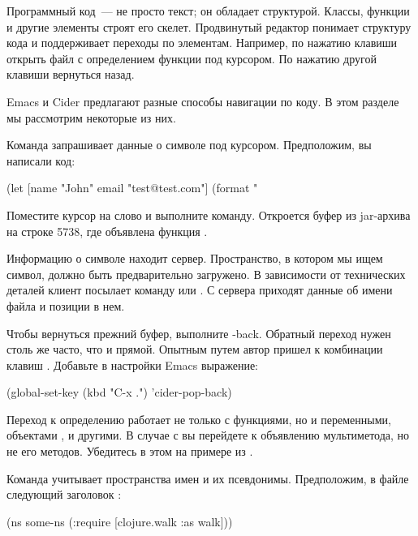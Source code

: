 Программный код~--- не просто текст; он обладает структурой. Классы, функции и другие элементы строят его скелет. Продвинутый редактор понимает структуру кода и поддерживает переходы по элементам. Например, по нажатию клавиши открыть файл с определением функции под курсором. По нажатию другой клавиши вернуться назад.

Emacs и Cider предлагают разные способы навигации по коду. В этом разделе мы рассмотрим некоторые из них.

Команда  запрашивает данные о символе под курсором. Предположим, вы написали код:

\begin{english}
  \begin{clojure}
(let [name "John"
      email "test@test.com"]
  (format "%
  \end{clojure}
\end{english}

Поместите курсор на слово  и выполните команду. Откроется буфер  из jar-архива на строке 5738, где объявлена функция .

Информацию о символе находит сервер. Пространство, в котором мы ищем символ, должно быть предварительно загружено. В зависимости от технических деталей клиент посылает команду  или . С сервера приходят данные об имени файла и позиции в нем.

Чтобы вернуться прежний буфер, выполните -back. Обратный переход нужен столь же часто, что и прямой. Опытным путем автор пришел к комбинации клавиш  . Добавьте в настройки Emacs выражение:

\begin{english}
  \begin{lisp}
(global-set-key (kbd "C-x .") 'cider-pop-back)
  \end{lisp}
\end{english}

Переход к определению работает не только с функциями, но и переменными, объектами ,  и другими. В случае с  вы перейдете к объявлению мультиметода, но не его методов. Убедитесь в этом на примере  из .

Команда  учитывает пространства имен и их псевдонимы. Предположим, в файле следующий заголовок :

\begin{english}
  \begin{clojure}
(ns some-ns
  (:require
   [clojure.walk :as walk]))
  \end{clojure}
\end{english}

